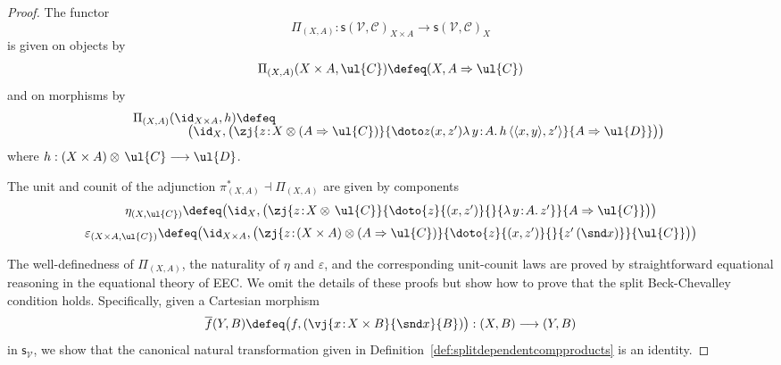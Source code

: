 \begin{proof}
The functor 
\[
\Pi_{(X,A)} : \mathsf{s}(\!\mathcal{V},\mathcal{C})_{X \times A} \longrightarrow \mathsf{s}(\!\mathcal{V},\mathcal{C})_X
\]
is given on objects by 
\[
\begin{array}{c}
\Pi_{(X,A)}(X \times A, \ul{C}) \defeq (X,A \Rightarrow \ul{C})
\end{array}
\]
and on morphisms by
\[
\begin{array}{c}
\hspace{-10.5cm} \Pi_{(X,A)}(\id_{X \times A},h) \defeq 
\\[-0.5mm]
\hspace{2cm} \big(\id_X, \big(\zj {z \!:\! X \otimes (A \Rightarrow \ul{C})} {\doto z {(x,z')} {} {\lambda\, y \!:\! A .\, h\, \langle \langle x , y \rangle , z' \rangle}} {A \Rightarrow \ul{D}}\big)\big)
\end{array}
\]
where $h : (X \times A) \otimes\, \ul{C} \longrightarrow \ul{D}$.

The unit and counit of the adjunction $\pi^*_{(X,A)} \dashv \Pi_{(X,A)}$ are given by components
\[
\begin{array}{c}
\eta_{(X, \ul{C})} \defeq \big(\id_X, \big(\zj {z \!:\! X \otimes\, \ul{C}} {\doto {z} {(x,z')} {} {\lambda\, y \!:\! A .\, z'}} {A \Rightarrow \ul{C}}\big)\big) 
\\[2mm]
\varepsilon_{(X \times A,\ul{C})} \defeq \big(\id_{X \times A}, \big(\zj {z \!:\! (X \times A) \otimes (A \Rightarrow \ul{C})} {\doto {z} {(x,z')} {} {z'\, (\snd x)}} {\ul{C}}\big)\big) 
\end{array}
\vspace{0.15cm}
\]

The well-definedness of $\Pi_{(X,A)}$, the naturality of $\eta$ and $\varepsilon$, and the corresponding unit-counit laws are proved by straightforward equational reasoning in the equational theory of EEC\raisebox{0.75pt}{+}. We omit the details of these proofs but show how to prove that the split Beck-Chevalley condition holds. 
%
Specifically, given a Cartesian morphism 
\[
\overline{f}(Y,B) \defeq \big(f, (\vj {x \!:\! X \times B} {\snd x} {B})\big) : (X,B) \longrightarrow (Y,B)
\]
in $\mathsf{s}_{\mathcal{V}}$, we show that the canonical natural transformation given in Definition~\ref{def:splitdependentcompproducts} is an identity. 


\end{proof}
